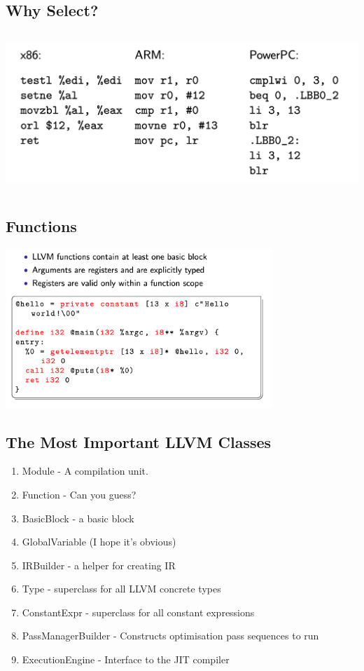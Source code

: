 \documentclass[a4paper]{article}
\theoremstyle{definition}
\begin{document}
  \subsection{Why Select?}
  \begin{center}
    \includegraphics[height=6cm]{img/Snipaste_2021-04-05_17-41-52.png}
    \end{center}
    
    \subsection{Functions}
    \begin{center}
      \includegraphics[height=6cm]{img/Snipaste_2021-04-05_17-42-34.png}
      \end{center}
\subsection{The Most Important LLVM Classes}

\begin{enumerate}
  \item Module - A compilation unit.
  \item Function - Can you guess?
  \item BasicBlock - a basic block
  \item GlobalVariable (I hope it’s obvious)
  \item IRBuilder - a helper for creating IR
  \item Type - superclass for all LLVM concrete types
  \item ConstantExpr - superclass for all constant expressions
  \item PassManagerBuilder - Constructs optimisation pass sequences to run
  \item ExecutionEngine - Interface to the JIT compiler
   
\end{enumerate}
\end{document}

